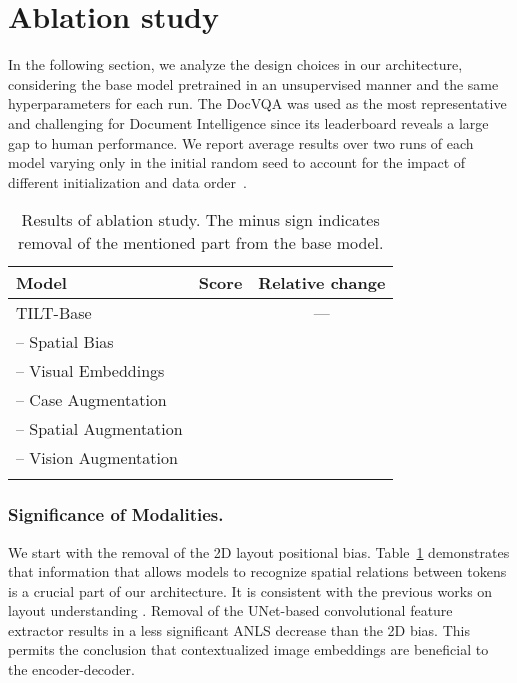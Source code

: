 \documentclass[runningheads]{llncs}
\begin{document}
\section{Ablation study}
In the following section, we analyze the design choices in our architecture, considering the base model pretrained in an unsupervised manner and the same hyperparameters for each run.
The DocVQA was used as the most representative and challenging for Document Intelligence since its leaderboard reveals a large gap to human performance.
We report average results over two runs of each model varying only in the initial random seed to account for the impact of different initialization and data order~\cite{dodge2020finetuning}. 



\begin{table}[t]
    \setlength{\tabcolsep}{7pt}
    \centering
    \begin{tabular}{lcc}
        \toprule
        Model &
        Score &
        Relative change\\

        \midrule
        TILT-Base &  & ---  \\
        \quad -- Spatial Bias &  & \\
        \quad -- Visual Embeddings&  & \\
        \quad -- Case Augmentation &  & \\
        \quad -- Spatial Augmentation &  & \\
        \quad -- Vision Augmentation &  & \\
        \bottomrule  \\
    \end{tabular}
    \caption{Results of ablation study. The minus sign indicates removal of the mentioned part from the base model. \label{tab:ablation}}
\end{table}


\subsubsection{Significance of Modalities.} We start with the removal of the 2D layout positional bias. Table~\ref{tab:ablation} demonstrates that information that allows models to recognize spatial relations between tokens is a crucial part of our architecture. It is consistent with the previous works on layout understanding \cite{xu2020layoutlmv2,garncarek2020lambert}. 
Removal of the UNet-based convolutional feature extractor results in a less significant ANLS decrease than the 2D bias. This permits the conclusion that contextualized image embeddings are beneficial to the encoder-decoder.
\end{document}
